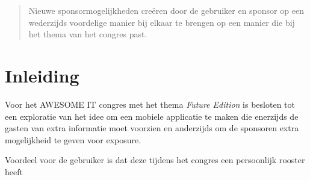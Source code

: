\documentclass{article}
\begin{document}
	\maketitle
	\begin{abstract} %
	Nieuwe sponsormogelijkheden cre\"eren door de gebruiker en sponsor op een
	wederzijds voordelige manier bij elkaar te brengen op een manier die bij
	het thema van het congres past.
	\end{abstract} %

	\section{Inleiding} %
	\label{sec:Inleiding}
	Voor het AWESOME IT congres met het thema \emph{Future Edition} is besloten
	tot een exploratie van het idee om een mobiele applicatie te maken die
	enerzijds de gasten van extra informatie moet voorzien en anderzijds om de
	sponsoren extra mogelijkheid te geven voor exposure.

	Voordeel voor de gebruiker is dat deze tijdens het congres een persoonlijk
	rooster heeft 
\end{document}
